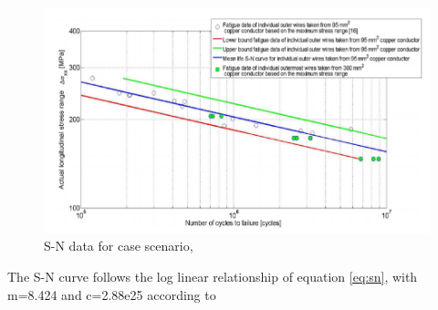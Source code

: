 \begin{figure}[H]
\centering
\includegraphics[scale=0.6]{figures/SNplot}
\caption[$\; \:$S-N data]{S-N data for case scenario,\cite{savik2014} }
 \label{fig:snplot}
\end{figure}
\noindent The S-N curve follows the log linear relationship of equation \ref{eq:sn}, with m=8.424 and c=2.88e25 according to \cite{Nasution2013}